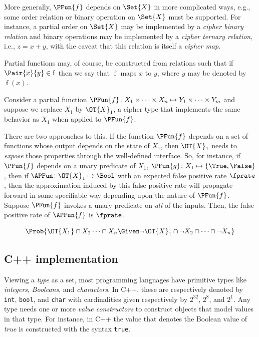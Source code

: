 \documentclass[ ../main.tex]{subfiles}
\begin{document}
	More generally, $\PFun{f}$ depends on $\Set{X}$ in more complicated ways, e.g., some order relation or binary operation on $\Set{X}$ must be supported.
	For instance, a partial order on $\Set{X}$ may be implemented by a \emph{cipher binary relation} and binary operations may be implemented by a \emph{cipher ternary relation}, i.e., $z=x+y$, with the caveat that this relation is itself a \emph{cipher map}.
	
	Partial functions may, of course, be constructed from relations such that if $\Pair{x}{y} \in \operatorname{f}$ then we say that $\operatorname{f}$ maps $x$ to $y$, where $y$ may be denoted by $\operatorname{f}(x)$.
	
Consider a partial function $\PFun{f} \colon X_1 \times \cdots \times X_n \mapsto Y_1 \times \cdots \times Y_m$ and suppose we replace $X_1$ by $\OT{X}_1$, a cipher type that implements the same behavior as $X_1$ when applied to $\PFun{f}$.
	
	There are two approaches to this.
	If the function $\PFun{f}$ depends on a set of functions whose output depends on the state of $X_1$, then $\OT{X}_1$ needs to \emph{expose} those properties through the well-defined interface.
	So, for instance, if $\PFun{f}$ depends on a unary predicate of $X_1$, $\PFun{g} \colon X_1 \mapsto \{\True,\False\}$, then if $\APFun \colon \OT{X}_1 \mapsto \Bool$ with an expected false positive rate $\fprate$, then the approximation induced by this false positive rate will propagate forward in some specifiable way depending upon the nature of $\PFun{f}$. Suppose $\PFun{f}$ invokes a unary predicate on \emph{all} of the inputs. Then, the false positive rate of $\APFun{f}$ is $\fprate$.
	
	\begin{equation}
	\Prob{\OT{X_1} \cap X_2 \cdots \cap X_n \Given \neg \OT{X}_1 \cap \neg X_2 \cap \cdots \cap \neg X_n}
	\end{equation}

\subsection{C++ implementation}
	Viewing a \emph{type} as a set, most programming languages have primitive types like \emph{integers}, \emph{Booleans}, and \emph{characters}.
	In C++, these are respectively denoted by \texttt{int}, \texttt{bool}, and \texttt{char} with cardinalities given respectively by $2^{32}$, $2^8$, and $2^1$.
	Any type needs one or more \emph{value constructors} to construct objects that model values in that type.
	For instance, in C++ the value that denotes the Boolean value of \emph{true} is constructed with the syntax \texttt{true}.
	
\end{document}
